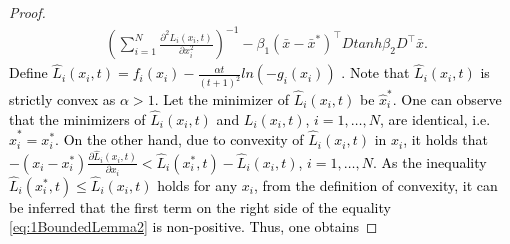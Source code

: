 \documentclass[letterpaper, 10 pt, conference]{ieeeconf}  %
\begin{document}
{\begin{proof}
\begin{align}
	& \left(\sum_{i=1}^{N}\frac{\partial^{2}L_{i}(x_{i},t)}{\partial x_{i}^{2}}\right)^{-1}-\beta_{1}(\bar{x}-\bar{x}^{*})^{\top}Dtanh\beta_{2}D^{\top}\bar{x}.\label{eq:1BoundedLemma2}
	\end{align}
	\textcolor{black}{Define $\hat{L}_{i}(x_{i},t)=f_{i}(x_{i})-\frac{\alpha t}{\left(t+1\right)^{2}}ln\left(-g_{i}(x_{i})\right)$
		. Note that $\hat{L}_{i}(x_{i},t)$ is strictly convex as $\alpha>1$.
		Let the minimizer of $\hat{L}_{i}(x_{i},t)$ be $\hat{x}_{i}^{*}$.
	}\textcolor{black}{One can observe that }\textcolor{black}{{} the minimizers of $\hat{L}_{i}(x_{i},t)$ and $L_{i}(x_{i},t)$,
		$i=1,\ldots,N$, are identical, i.e. $\hat{x}_{i}^{*}=x_{i}^{*}$.
	}\textcolor{black}{On the other hand,}\textcolor{black}{{} due to convexity
		of $\hat{L}_{i}(x_{i},t)$ in $x_{i}$, it holds that $-\left(x_{i}-x_{i}^{*}\right)\frac{\partial\hat{L}_{i}(x_{i},t)}{\partial x_{i}}<\hat{L}_{i}(x_{i}^{*},t)-\hat{L}_{i}(x_{i},t)$,
		$i=1,\ldots,N$. As the inequality $\hat{L}_{i}(x_{i}^{*},t)\leq\hat{L}_{i}(x_{i},t)$
		holds for any $x_{i}$, from the definition of convexity, it can be
		inferred that the first term on the right side of the equality \eqref{eq:1BoundedLemma2}
		is non-positive. }\textcolor{black}{Thus, one obtains}
	

\end{proof}}
\end{document}
